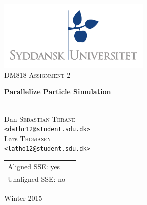\documentclass[a4paper,11pt,oneside]{book}
\title{}
\author{}
\date{}
\begin{document}
\begin{titlepage}
\begin{center}

\thispagestyle{empty}
\includegraphics[width=0.55\textwidth]{logo.pdf}\\[1cm]    
\textsc{\Large DM818 Assignment 2}\\[0.5cm]

\begin{Huge}
\textbf{Parallelize Particle Simulation}
\end{Huge}

\vspace{4cm}

\begin{minipage}{1\textwidth}
\begin{center}
\emph{}\\

Dan \textsc{Sebastian Thrane}\\
\verb!<dathr12@student.sdu.dk>!\\

Lars \textsc{Thomasen}\\
\verb!<latho12@student.sdu.dk>!\\

\end{center}
\end{minipage}
\begin{minipage}{0.4\textwidth}
\end{minipage}

\vfill
\begin{tabular}{ll}
    Aligned SSE: yes \\
    Unaligned SSE: no \\
\end{tabular}
\vfill

{\large Winter 2015}\\

\end{center}
\end{titlepage}
\end{document}
